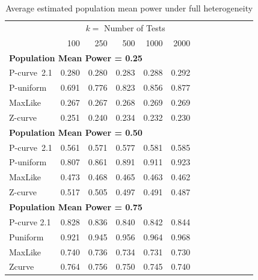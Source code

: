 \documentclass[jou]{apa6} %
\begin{document}
\begin{table}[h]
\caption{Average estimated population mean power under full heterogeneity}
{\small
\begin{center}
\begin{tabular}{lrrrrr c lrrrrr}  \hline
      & \multicolumn{5}{c}{$k=$ Number of Tests}  \\ 
      &  100  &  250   &  500   & 1000   & 2000  \\ \hline
\multicolumn{6}{l}{\textbf{Population Mean Power = 0.25}} \\ \hline
P-curve~2.1   & 0.280  & 0.280  & 0.283  & 0.288  & 0.292  \\
P-uniform & 0.691  & 0.776  & 0.823  & 0.856  & 0.877  \\
MaxLike   & 0.267  & 0.267  & 0.268  & 0.269  & 0.269   \\
Z-curve   & 0.251  & 0.240  & 0.234  & 0.232  & 0.230  \\ \hline
\multicolumn{6}{l}{\textbf{Population Mean Power = 0.50}} \\ \hline
P-curve~2.1   & 0.561  & 0.571  & 0.577  & 0.581  & 0.585 \\
P-uniform & 0.807  & 0.861  & 0.891  & 0.911  & 0.923 \\
MaxLike   & 0.473  & 0.468  & 0.465  & 0.463  & 0.462 \\
Z-curve   & 0.517  & 0.505  & 0.497  & 0.491  & 0.487 \\ \hline
\multicolumn{6}{l}{\textbf{Population Mean Power = 0.75}} \\ \hline
P-curve 2.1   & 0.828  & 0.836  & 0.840  & 0.842  & 0.844 \\
Puniform & 0.921  & 0.945  & 0.956  & 0.964  & 0.968 \\
MaxLike  & 0.740  & 0.736  & 0.734  & 0.731  & 0.730 \\
Zcurve   & 0.764  & 0.756  & 0.750  & 0.745  & 0.740 \\ \hline
\end{tabular}
\end{center}
} %
\label{fullmean}  %
\end{table}
\end{document}
